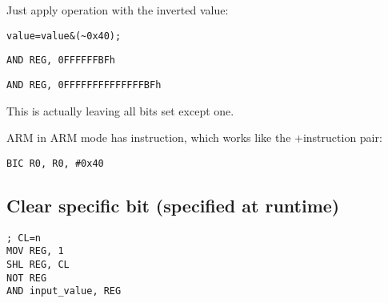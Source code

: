 Just apply \AND operation with the inverted value:

\begin{lstlisting}[caption=\CCpp]
value=value&(~0x40);
\end{lstlisting}

\begin{lstlisting}[caption=x86]
AND REG, 0FFFFFFBFh
\end{lstlisting}

\begin{lstlisting}[caption=x64]
AND REG, 0FFFFFFFFFFFFFFBFh
\end{lstlisting}

This is actually leaving all bits set except one.


ARM in ARM mode has \BIC instruction, which works like the \NOT+\AND instruction pair:

\begin{lstlisting}[caption=ARM (\ARMMode)]
BIC R0, R0, #0x40
\end{lstlisting}

\subsection{
Clear specific bit (specified at runtime)}



\begin{lstlisting}[caption=x86]
; CL=n
MOV REG, 1
SHL REG, CL
NOT REG
AND input_value, REG
\end{lstlisting}

